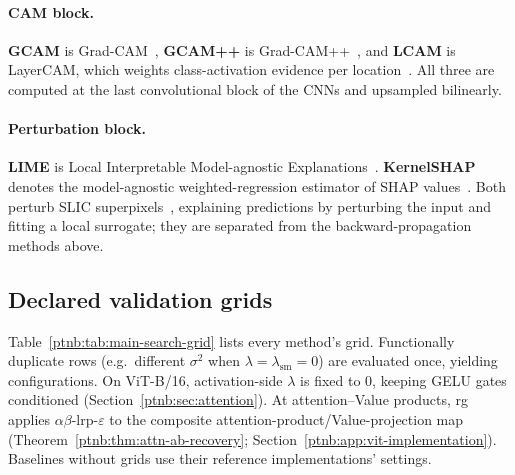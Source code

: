 \paragraph{CAM block.}
\textbf{GCAM} is Grad-CAM~\parencite{Selvaraju2017}, \textbf{GCAM++} is Grad-CAM++~\parencite{Chattopadhay2018}, and \textbf{LCAM} is LayerCAM, which weights class-activation evidence per location~\parencite{Jiang2021LayerCAM}. All three are computed at the last convolutional block of the CNNs and upsampled bilinearly.

\paragraph{Perturbation block.}
\textbf{LIME} is Local Interpretable Model-agnostic Explanations~\parencite{Ribeiro2016}. \textbf{KernelSHAP} denotes the model-agnostic weighted-regression estimator of SHAP values~\parencite{LundbergLee2017}. Both perturb SLIC superpixels~\parencite{Achanta2012slic}, explaining predictions by perturbing the input and fitting a local surrogate; they are separated from the backward-propagation methods above.

\subsection{Declared validation grids}\label{ptnb:app:grids}

Table~\ref{ptnb:tab:main-search-grid} lists every method's grid. Functionally duplicate rows (e.g.\ different $\sigma^2$ when $\lambda = \lambda_{\mathrm{sm}} = 0$) are evaluated once, yielding \nValGrid{} configurations. On ViT-B/16, activation-side $\lambda$ is fixed to $0$, keeping GELU gates conditioned (Section~\ref{ptnb:sec:attention}). At attention--Value products, \ac{rg} applies $\alpha\beta$-\ac{lrp}-$\varepsilon$ to the composite attention-product/Value-projection map (Theorem~\ref{ptnb:thm:attn-ab-recovery}; Section~\ref{ptnb:app:vit-implementation}). Baselines without grids use their reference implementations' settings.

